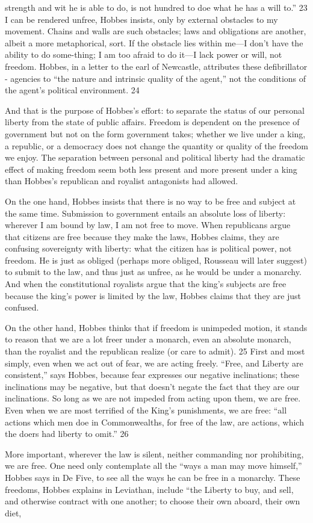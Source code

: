 strength and wit he is able to do, is not hundred to doe what he has a will to.” {\color{blue} 23 } I can be rendered unfree, Hobbes insists, only by external obstacles to my movement. Chains and walls are such obstacles; laws and obligations are another, albeit a more metaphorical, sort. If the obstacle lies within me—I don’t have the ability to do some-thing; I am too afraid to do it—I lack power or will, not freedom. Hobbes, in a letter to the earl of Newcastle, attributes these defibrillator - agencies to “the nature and intrinsic quality of the agent,” not the conditions of the agent’s political environment. {\color{blue} 24 } {\par} And that is the purpose of Hobbes’s effort: to separate the status of our personal liberty from the state of public affairs. Freedom is dependent on the presence of government but not on the form government takes; whether we live under a king, a republic, or a democracy does not change the quantity or quality of the freedom we enjoy. The separation between personal and political liberty had the dramatic effect of making freedom seem both less present and more present under a king than Hobbes’s republican and royalist antagonists had allowed.{\par} On the one hand, Hobbes insists that there is no way to be free and subject at the same time. Submission to government entails an absolute loss of liberty: wherever I am bound by law, I am not free to move. When republicans argue that citizens are free because they make the laws, Hobbes claims, they are confusing sovereignty with liberty: what the citizen has is political power, not freedom. He is just as obliged (perhaps more obliged, Rousseau will later suggest) to submit to the law, and thus just as unfree, as he would be under a monarchy. And when the constitutional royalists argue that the king’s subjects are free because the king’s power is limited by the law, Hobbes claims that they are just confused.{\par} On the other hand, Hobbes thinks that if freedom is unimpeded motion, it stands to reason that we are a lot freer under a monarch, even an absolute monarch, than the royalist and the republican realize (or care to admit). {\color{blue} 25 } First and most simply, even when we act out of fear, we are acting freely. “Free, and Liberty are consistent,” says Hobbes, because fear expresses our negative inclinations; these inclinations may be negative, but that doesn’t negate the fact that they are our inclinations. So long as we are not impeded from acting upon them, we are free. Even when we are most terrified of the King’s punishments, we are free: “all actions which men doe in Commonwealths, for free of the law, are actions, which the doers had liberty to omit.” {\color{blue} 26 } {\par} More important, wherever the law is silent, neither commanding nor prohibiting, we are free. One need only contemplate all the “ways a man may move himself,” Hobbes says in De Five, to see all the ways he can be free in a monarchy. These freedoms, Hobbes explains in Leviathan, include “the Liberty to buy, and sell, and otherwise contract with one another; to choose their own aboard, their own diet, 